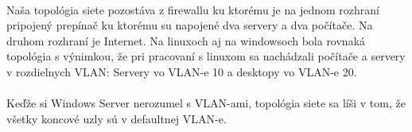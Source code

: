 \paragraph{}
Naša topológia siete pozostáva z firewallu ku ktorému je na jednom rozhraní pripojený prepínač ku ktorému su napojené dva servery a dva počítače. Na druhom rozhraní je Internet. Na linuxoch aj na windowsoch bola rovnaká topológia s výnimkou, že pri pracovaní s linuxom sa nachádzali počítače a servery v rozdielnych VLAN: Servery vo VLAN-e 10 a desktopy vo VLAN-e 20.
\paragraph{}
Keďže si Windows Server nerozumel s VLAN-ami, topológia siete sa líši v tom, že všetky koncové uzly sú v defaultnej VLAN-e.
